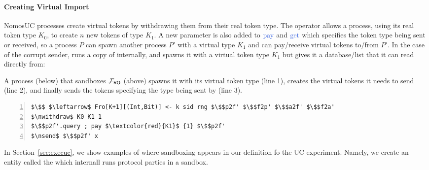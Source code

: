 \paragraph{Creating Virtual Import}
NomosUC processes create virtual tokens by withdrawing them from their real token type. 
The operator  allows a process, using its real token type $K_0$, to create $n$ new tokens of type $K_1$.
A new parameter is also added to $\npay$ and $\nget$ which specifies the token type being sent or received, so a process $P$ can spawn another process $P'$ with a virtual type $K_1$ and can pay/receive virtual tokens to/from $P'$.
In the case of the corrupt sender, \simcom runs a copy of \Fro internally, and spawns it with a virtual token type $K_1$ but gives it a database/list that it can read directly from:


A process (below) that sandboxes $\mathcal{F}_{{\mathsf {RO}}}$ (above) spawns it with its virtual token type (line 1), creates the virtual tokens it needs to send (line 2), and finally sends the tokens specifying the type being sent by \inline{$\npay$} (line 3).
\begin{lstlisting}[basicstyle=\scriptsize\BeraMonottFamily, frame=single, mathescape, numbers=left, xleftmargin=2em, xrightmargin=2em]
$\$$ $\leftarrow$ Fro[K+1][(Int,Bit)] <- k sid rng $\$$p2f' $\$$f2p' $\$$a2f' $\$$f2a' 
$\nwithdraw$ K0 K1 1
$\$$p2f'.query ; pay $\textcolor{red}{K1}$ {1} $\$$p2f' 
$\nsend$ $\$$p2f' x
\end{lstlisting}
In Section~\ref{sec:execuc}, we show examples of where sandboxing appears in our definition fo the UC experiment. Namely, we create an entity called the \partywrapper which internall runs protocol parties in a sandbox.

